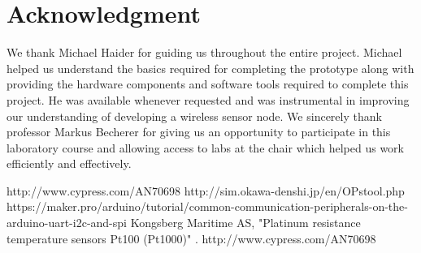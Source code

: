 \documentclass[conference]{IEEEtran}
\begin{document}
\section*{Acknowledgment}

We thank Michael Haider for guiding us throughout the entire project. Michael helped us understand the basics required for completing the prototype along with providing the hardware components and software tools required to complete this project. He was available whenever requested and was instrumental in improving our understanding of developing a wireless sensor node. We sincerely thank professor Markus Becherer for giving us an opportunity to participate in this laboratory course and allowing access to labs at the chair which helped us work efficiently and effectively.


\begin{thebibliography}{00}
 http://www.cypress.com/AN70698
 http://sim.okawa-denshi.jp/en/OPstool.php
 https://maker.pro/arduino/tutorial/common-communication-peripherals-on-the-arduino-uart-i2c-and-spi
 Kongsberg Maritime AS, "Platinum resistance temperature sensors Pt100 (Pt1000)" .
 http://www.cypress.com/AN70698
\end{thebibliography}

%
\end{document}
